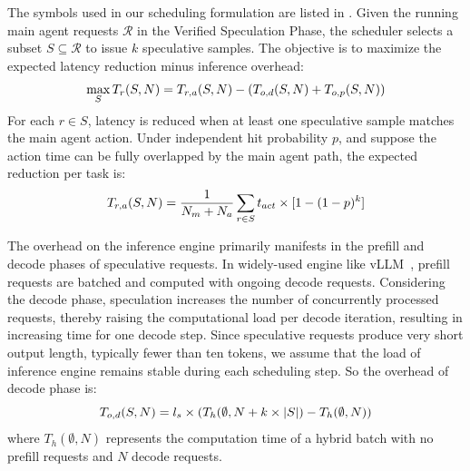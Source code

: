 The symbols used in our scheduling formulation are listed in .
Given the running main agent requests $\mathcal{R}$ in the Verified Speculation Phase, the scheduler selects a subset $S\subseteq\mathcal{R}$ to issue $k$ speculative samples.
The objective is to maximize the expected latency reduction minus inference overhead:
\begin{equation}
    \small
    \max_{S} T_r(S, N) = T_{r,a}(S, N) - (T_{o,d}(S, N)+T_{o,p}(S,N))
\end{equation}
For each $r\in S$, latency is reduced when at least one speculative sample matches the main agent action.
Under independent hit probability $p$, and suppose the action time can be fully overlapped by the main agent path, the expected reduction per task is:
\begin{equation}
    \small
    T_{r,a}(S, N) = \frac{1}{N_m + N_a}\sum_{r\in S} t_{act} \times [1-(1-p)^k]
\end{equation}

The overhead on the inference engine primarily manifests in the prefill and decode phases of speculative requests.
In widely-used engine like vLLM~\cite{vllm}, prefill requests are batched and computed with ongoing decode requests.
Considering the decode phase, speculation increases the number of concurrently processed requests, thereby raising the computational load per decode iteration, resulting in increasing time for one decode step.
Since speculative requests produce very short output length, typically fewer than ten tokens, we assume that the load of inference engine remains stable during each scheduling step.
So the overhead of decode phase is:
\begin{equation}
    \small
    T_{o,d}(S, N) = l_s \times (T_h(\emptyset, N+k\times |S|)-T_h(\emptyset, N))
\end{equation}
where $T_h(\emptyset, N)$ represents the computation time of a hybrid batch with no prefill requests and $N$ decode requests.

